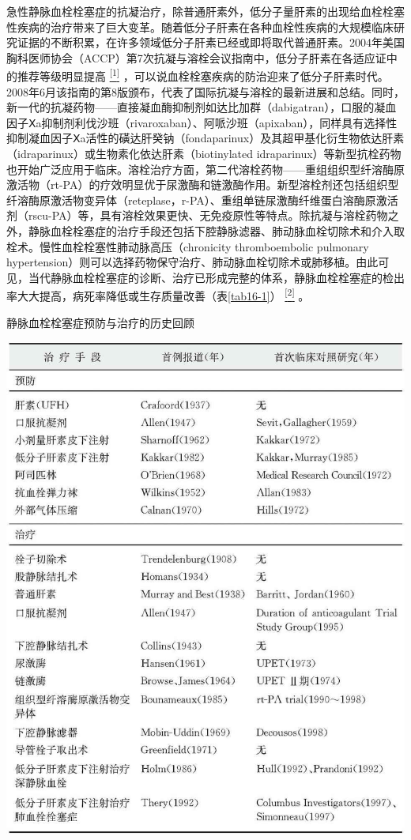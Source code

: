 急性静脉血栓栓塞症的抗凝治疗，除普通肝素外，低分子量肝素的出现给血栓栓塞性疾病的治疗带来了巨大变革。随着低分子肝素在各种血栓性疾病的大规模临床研究证据的不断积累，在许多领域低分子肝素已经或即将取代普通肝素。2004年美国胸科医师协会（ACCP）第7次抗凝与溶栓会议指南中，低分子肝素在各适应证中的推荐等级明显提高
\protect\hyperlink{text00022.htmlux5cux23ch1-21}{\textsuperscript{{[}1{]}}}
，可以说血栓栓塞疾病的防治迎来了低分子肝素时代。2008年6月该指南的第8版颁布，代表了国际抗凝与溶栓的最新进展和总结。同时，新一代的抗凝药物------直接凝血酶抑制剂如达比加群（dabigatran），口服的凝血因子Ⅹa抑制剂利伐沙班（rivaroxaban）、阿哌沙班（apixaban），同样具有选择性抑制凝血因子Ⅹa活性的磺达肝癸钠（fondaparinux）及其超甲基化衍生物依达肝素（idraparinux）或生物素化依达肝素（biotinylated
idraparinux）等新型抗栓药物也开始广泛应用于临床。溶栓治疗方面，第二代溶栓药物------重组组织型纤溶酶原激活物（rt-PA）的疗效明显优于尿激酶和链激酶作用。新型溶栓剂还包括组织型纤溶酶原激活物变异体（reteplase，r-PA）、重组单链尿激酶纤维蛋白溶酶原激活剂（rscu-PA）等，具有溶栓效果更快、无免疫原性等特点。除抗凝与溶栓药物之外，静脉血栓栓塞症的治疗手段还包括下腔静脉滤器、肺动脉血栓切除术和介入取栓术。慢性血栓栓塞性肺动脉高压（chronicity
thromboembolic pulmonary
hypertension）则可以选择药物保守治疗、肺动脉血栓切除术或肺移植。由此可见，当代静脉血栓栓塞症的诊断、治疗已形成完整的体系，静脉血栓栓塞症的检出率大大提高，病死率降低或生存质量改善（表\ref{tab16-1}）
\protect\hyperlink{text00022.htmlux5cux23ch2-21}{\textsuperscript{{[}2{]}}}
。

\begin{table}[htbp]
\centering
\caption{静脉血栓栓塞症预防与治疗的历史回顾}
\label{tab16-1}
\includegraphics[width=\textwidth,height=\textheight,keepaspectratio]{./images/Image00116.jpg}
\end{table}

